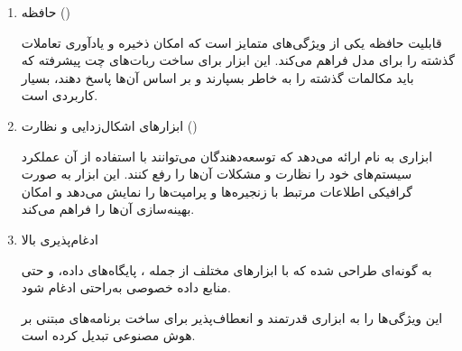 \documentclass[11pt, a4paper, oneside]{book}
\begin{document}
\begin{enumerate}
					ویژگی‌های کلیدی عامل‌ها:
					
					\begin{itemize}
						
						\item {\large دسترسی به ابزارها}:
						توانایی استفاده از ها، پایگاه‌های داده، موتورهای جستجو و ابزارهای خارجی.
						
						\item {\large تصمیم‌گیری پویا}:
						انتخاب مسیر و ابزار مناسب برای حل مشکلات در لحظه.
						
						\item {\large مدیریت وظایف پیچیده}:
						انجام چند مرحله پردازش یا ادغام اطلاعات از منابع مختلف.
						
					\end{itemize}
					در وظایفی مانند پرسش و پاسخ پیشرفته، اتوماسیون فرآیندها، و تعامل با خدمات خارجی استفاده می‌شوند. آن‌ها ابزاری انعطاف‌پذیر برای توسعه سیستم‌های هوشمند و پویا هستند.
					
					\item {\large حافظه ()} \par
					قابلیت حافظه یکی از ویژگی‌های متمایز  است که امکان ذخیره و یادآوری تعاملات گذشته را برای مدل فراهم می‌کند. این ابزار برای ساخت ربات‌های چت پیشرفته که باید مکالمات گذشته را به خاطر بسپارند و بر اساس آن‌ها پاسخ دهند، بسیار کاربردی است.
					
					\item {\large ابزارهای اشکال‌زدایی و نظارت ()} \par
					ابزاری به نام  ارائه می‌دهد که توسعه‌دهندگان می‌توانند با استفاده از آن عملکرد سیستم‌های خود را نظارت و مشکلات آن‌ها را رفع کنند. این ابزار به صورت گرافیکی اطلاعات مرتبط با زنجیره‌ها و پرامپت‌ها را نمایش می‌دهد و امکان بهینه‌سازی آن‌ها را فراهم می‌کند.
					
					\item {\large ادغام‌پذیری بالا} \par
					به گونه‌ای طراحی شده که با ابزارهای مختلف از جمله ، پایگاه‌های داده، و حتی منابع داده خصوصی به‌راحتی ادغام شود.
					
					این ویژگی‌ها  را به ابزاری قدرتمند و انعطاف‌پذیر برای ساخت برنامه‌های مبتنی بر هوش مصنوعی تبدیل کرده است.
					
				\end{enumerate}
			
			\subsection{}
			
\end{document}
